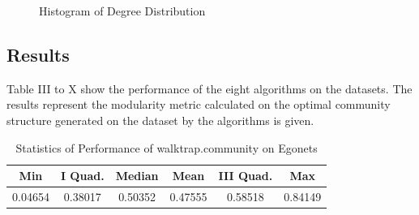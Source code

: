 \begin{figure}[H]
\centering
{}
\caption{Histogram of Degree Distribution}
\label{fig 1}
\end{figure}

\subsection{Results}

Table III to X show the performance of the eight algorithms on the datasets. The results represent the modularity metric calculated on the optimal community structure generated on the dataset by the algorithms is given.

\begin{table}[!h]
\renewcommand{\arraystretch}{1.3}
\caption{Statistics of Performance of walktrap.community on Egonets}
\label{table}
\centering
\begin{tabular}{|c|c|c|c|c|c|}
  \hline
\multicolumn{1}{|c|}{\textbf{Min}} & \multicolumn{1}{c|}{\textbf{I Quad.}} & \multicolumn{1}{c|}{\textbf{Median}} & \multicolumn{1}{c|}{\textbf{Mean}} & \multicolumn{1}{c|}{\textbf{III Quad.}} & \multicolumn{1}{c|}{\textbf{Max}}        \\
  \hline
  0.04654 & 0.38017 & 0.50352 & 0.47555 & 0.58518 & 0.84149\\
   \hline
\end{tabular}
\end{table}

